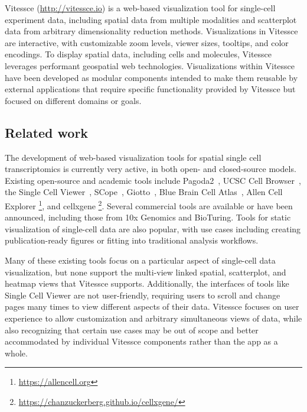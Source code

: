 \documentclass[12pt, letterpaper]{article}
\begin{document}
Vitessce (\url{http://vitessce.io}) is a web-based visualization tool for single-cell experiment data, including spatial data from multiple modalities and scatterplot data from arbitrary dimensionality reduction methods.
Visualizations in Vitessce are interactive, with customizable zoom levels, viewer sizes, tooltips, and color encodings.
To display spatial data, including cells and molecules, Vitessce leverages performant geospatial web technologies.
Visualizations within Vitessce have been developed as modular components intended to make them reusable by external applications that require specific functionality provided by Vitessce but focused on different domains or goals.

\subsection{Related work}
The development of web-based visualization tools for spatial single cell transcriptomics is currently very active, in both open- and closed-source models.
Existing open-source and academic tools include Pagoda2~\cite{lake2018integrative}, UCSC Cell Browser~\cite{nowakowski2017spatiotemporal}, the Single Cell Viewer~\cite{wang2019single}, SCope~\cite{wouters2019single}, Giotto~\cite{dries2019giotto}, Blue Brain Cell Atlas~\cite{ero2019cell}, Allen Cell Explorer \footnote{\url{https://allencell.org}}, and cellxgene \footnote{\url{https://chanzuckerberg.github.io/cellxgene/}}.
Several commercial tools are available or have been announced, including those from 10x Genomics and BioTuring.
Tools for static visualization of single-cell data are also popular, with use cases including creating publication-ready figures or fitting into traditional analysis workflows.

Many of these existing tools focus on a particular aspect of single-cell data visualization, but none support the multi-view linked spatial, scatterplot, and heatmap views that Vitessce supports.
Additionally, the interfaces of tools like Single Cell Viewer are not user-friendly, requiring users to scroll and change pages many times to view different aspects of their data.
Vitessce focuses on user experience to allow customization and arbitrary simultaneous views of data, while also recognizing that certain use cases may be out of scope and better accommodated by individual Vitessce components rather than the app as a whole.
\end{document}
